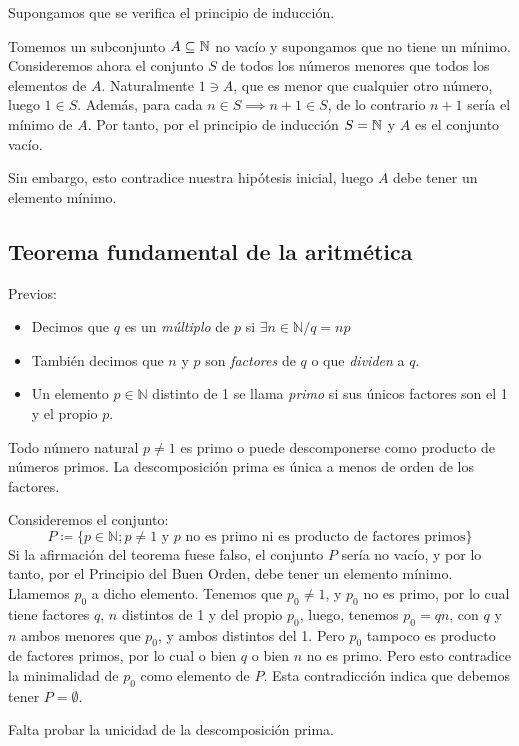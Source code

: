 \begin{fmd-proof}
	Supongamos que se verifica el principio de inducción.
	
	Tomemos un subconjunto $A \subseteq \mathbb{N}$ no vacío y supongamos que no tiene un mínimo. Consideremos ahora el conjunto $S$ de todos los números menores que todos los elementos de $A$. Naturalmente $1 \ni A$, que es menor que cualquier otro número, luego $1 \in S$. Además, para cada $n \in S \implies n + 1 \in S$, de lo contrario $n+1$ sería el mínimo de $A$. Por tanto, por el principio de inducción $S = \mathbb{N}$ y $A$ es el conjunto vacío.
	
	Sin embargo, esto contradice nuestra hipótesis inicial, luego $A$ debe tener un elemento mínimo.
\end{fmd-proof}

\subsection{Teorema fundamental de la aritmética} \label{sec:arit}
Previos:
\begin{itemize}
	\item Decimos que $q$ es un \textit{múltiplo} de $p$ si $\exists n \in \mathbb{N} / q = np$
	\item También decimos que $n$ y $p$ son \textit{factores} de $q$ o que \textit{dividen} a $q$.
	\item Un elemento $p\in \mathbb{N}$ distinto de 1 se llama \textit{primo} si sus únicos factores son el 1 y el propio $p$.
\end{itemize}

\begin{fmd-theorem}
	Todo número natural $p\ne 1$ es primo o puede descomponerse como producto de números primos. La descomposición prima es única a menos de orden de los factores.
\end{fmd-theorem}


\begin{fmd-proof}
	Consideremos el conjunto:
	\[P \coloneqq \{ p \in \mathbb{N}; p \ne 1 \mbox{ y } p \mbox{ no es primo ni es producto de factores primos} \}\]
	Si la afirmación del teorema fuese falso, el conjunto $P$ sería no vacío, y por lo tanto, por el
	Principio del Buen Orden, debe tener un elemento mínimo. Llamemos $p_0$ a dicho elemento.
	Tenemos que $p_0 \ne 1$, y $p_0$ no es primo, por lo cual tiene factores $q$, $n$ distintos de 1 y del propio $p_0$, luego, tenemos $p_0 = qn$, con $q$ y $n$ ambos menores que $p_0$, y ambos distintos del 1. Pero $p_0$ tampoco es producto de factores primos, por lo cual o bien $q$ o bien $n$ no es primo. Pero esto contradice la minimalidad de $p_0$ como elemento de $P$. Esta contradicción indica que debemos tener $P = \emptyset$.
\end{fmd-proof}
Falta probar la unicidad de la descomposición prima.


